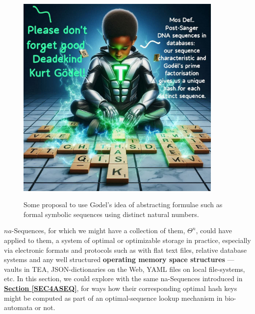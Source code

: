 \documentclass[a4paper, 18pt]{book} %
\begin{document}
\begin{figure}[H]
  \begin{center}
   \includegraphics[width=0.9\textwidth,]{resources/images/further_analysis.jpg}\\
   \caption{Some proposal to use G$\ddot{o}$del's idea of abstracting formulae such as formal symbolic sequences using distinct natural numbers.}
  \label{FIGGODELIDEA}
  \end{center}
\end{figure}


$na$-Sequences, for which we might have a collection of them, $\Theta^n$, could have applied to them, a system of optimal or optimizable storage in practice, especially via electronic formats and protocols such as with flat text files, relative database systems and any well structured \textbf{operating memory space structures} --- vaults in TEA\cite{Lutalo2024_taz}, JSON-dictionaries on the Web\cite{lutalo_tea_web}, YAML files on local file-systems, etc. In this section, we could explore with the same na-Sequences introduced in \textbf{\hyperref[SEC4ASEQ]{Section \ref{SEC4ASEQ}}}, for ways how their corresponding optimal hash keys might be computed as part of an optimal-sequence lookup mechanism in bio-automata or not.
\end{document}
